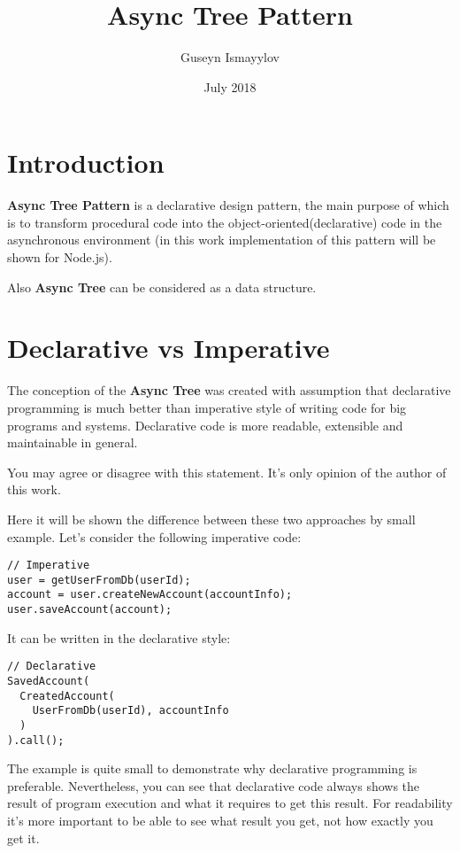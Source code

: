 \documentclass{article}
\title{Async Tree Pattern}
\author{Guseyn Ismayylov}
\date{July 2018}
\begin{document}
\maketitle

\section{Introduction}

\textbf{Async Tree Pattern} is a declarative design pattern, the main purpose of which is to transform procedural code into the object-oriented(declarative) code in the asynchronous environment (in this work implementation of this pattern will be shown for Node.js).

Also \textbf{Async Tree} can be considered as a data structure.
\section{Declarative vs Imperative}

The conception of the \textbf{Async Tree} was created with assumption that declarative programming is much better than imperative style of writing code for big programs and systems. Declarative code is more readable, extensible and maintainable in general.

You may agree or disagree with this statement. It's only opinion of the author of this work.

Here it will be shown the difference between these two approaches by small example. Let's consider the following imperative code:  

\begin{lstlisting}
// Imperative
user = getUserFromDb(userId);
account = user.createNewAccount(accountInfo);
user.saveAccount(account);
\end{lstlisting}

It can be written in the declarative style:

\begin{lstlisting}
// Declarative
SavedAccount(
  CreatedAccount(
    UserFromDb(userId), accountInfo
  )
).call();
\end{lstlisting}

The example is quite small to demonstrate why declarative programming is preferable. Nevertheless, you can see that declarative code always shows the result of program execution and what it requires to get this result. For readability it's more important to be able to see what result you get, not how exactly you get it.
\end{document}
